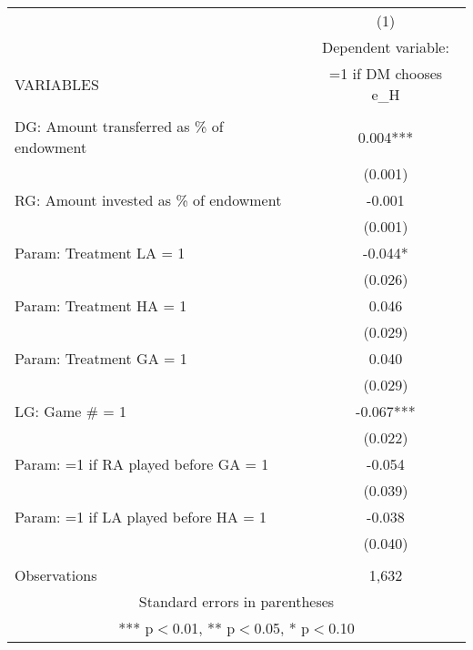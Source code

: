 \documentclass[]{article}
\begin{document}
\begin{tabular}{lc} \hline
 & (1) \\
 & Dependent variable: \\
VARIABLES & =1 if DM chooses e\_H \\ \hline
 &  \\
DG: Amount transferred as \% of endowment & 0.004*** \\
 & (0.001) \\
RG: Amount invested as \% of endowment & -0.001 \\
 & (0.001) \\
Param: Treatment LA = 1 & -0.044* \\
 & (0.026) \\
Param: Treatment HA = 1 & 0.046 \\
 & (0.029) \\
Param: Treatment GA = 1 & 0.040 \\
 & (0.029) \\
LG: Game \# = 1 & -0.067*** \\
 & (0.022) \\
Param: =1 if RA played before GA = 1 & -0.054 \\
 & (0.039) \\
Param: =1 if LA played before HA = 1 & -0.038 \\
 & (0.040) \\
 &  \\
 Observations & 1,632 \\ \hline
\multicolumn{2}{c}{ Standard errors in parentheses} \\
\multicolumn{2}{c}{ *** p$<$0.01, ** p$<$0.05, * p$<$0.10} \\
\end{tabular}
\end{document}
